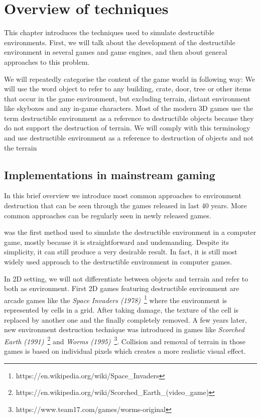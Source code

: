 \chapter{Overview of techniques}
This chapter introduces the techniques used to simulate destructible environments. First, we will talk about the development of the destructible environment in several games and game engines, and then about general approaches to this problem.

We will repeatedly categorise the content of the game world in following way: We will use the word object to refer to any building, crate, door, tree or other items that occur in the game environment, but excluding terrain, distant environment like skyboxes and any in-game characters. Most of the modern 3D games use the term destructible environment as a reference to destructible objects because they do not support the destruction of terrain. We will comply with this terminology and use destructible environment as a reference to destruction of objects and not the terrain

\section{Implementations in mainstream gaming}

In this brief overview we introduce most common approaches to environment destruction that can be seen through the games released in last 40 years. More common approaches can be regularly seen in newly released games. 

 was the first method used to simulate the destructible environment in a computer game, mostly because it is straightforward and undemanding. Despite its simplicity, it can still produce a very desirable result. In fact, it is still most widely used approach to the destructible environment in computer games.

In 2D setting, we will not differentiate between objects and terrain and refer to both as environment.
First 2D games featuring destructible environment are arcade games like the \emph{Space Invaders (1978)}~\footnote{https://en.wikipedia.org/wiki/Space\_Invaders} where the environment is represented by cells in a grid. After taking damage, the texture of the cell is replaced by another one and the finally completely removed. A few years later, new environment destruction technique was introduced in games like \emph{Scorched Earth (1991)}~\footnote{https://en.wikipedia.org/wiki/Scorched\_Earth\_(video\_game)} and \emph{Worms (1995)}~\footnote{https://www.team17.com/games/worms-original}. Collision and removal of terrain in those games is based on individual pixels which creates a more realistic visual effect.

